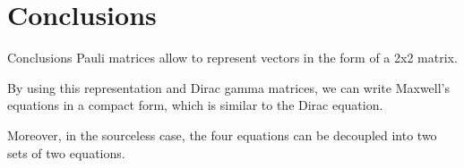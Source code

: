 \documentclass[10pt]{beamer}
\begin{document}
%
%
%
%

%
%
%
%
%
%
%
%
%


\section{Conclusions}

\begin{frame}{Conclusions}
Pauli matrices allow to represent vectors in the form of a 2x2 matrix.

By using this representation and Dirac gamma matrices, we can write Maxwell's equations in a compact form, which is similar to the Dirac equation.

Moreover, in the sourceless case, the four equations can be decoupled into  two sets of two equations.

\end{frame}
\end{document}
